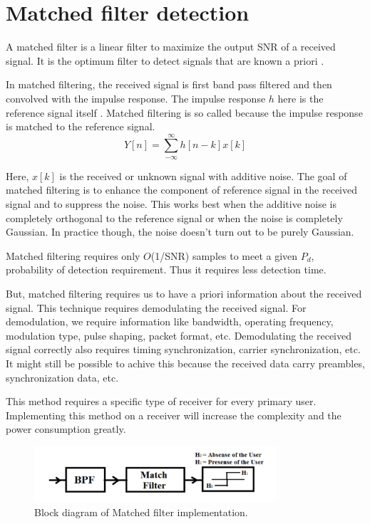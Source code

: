 \section{Matched filter detection}
A matched filter is a linear filter to maximize the output SNR of a received 
signal. It is the optimum filter to detect signals that are known a priori 
\cite{wikiMF}.


In matched filtering, the received signal is first band pass filtered and then
convolved with the impulse response. The impulse response $h$ here is the 
reference signal itself \cite{bhatta11}. Matched filtering is so called 
because the impulse response is matched to the reference signal.
\begin{equation*}
    Y[n] = \sum_{-\infty}^{\infty} h[n-k]x[k]
\end{equation*}

Here, $x[k]$ is the received or unknown signal with additive noise.
The goal of matched filtering is to enhance the component of reference signal
in the received signal and to suppress the noise. This works best when the 
additive noise is completely orthogonal to the reference signal or when the
noise is completely Gaussian. In practice though, the noise doesn't turn out 
to be purely Gaussian.
 
Matched filtering requires only $O$(1/SNR) samples to meet a given $P_d$, 
probability of detection requirement. Thus it requires less detection time.

But, matched filtering requires us to have a priori information about the 
received signal. This technique requires demodulating the received signal. For
demodulation, we require information like bandwidth, operating frequency, 
modulation type, pulse shaping, packet format, etc. Demodulating the received
signal correctly also requires timing synchronization, carrier 
synchronization, etc. It might still be possible to achive this because the
received data carry preambles, synchronization data, etc.

This method requires a specific type of receiver for every primary user.
Implementing this method on a receiver will increase the complexity and the 
power consumption greatly.

\begin{figure}
\centering
\includegraphics[width=0.8\textwidth]{matchedFilter}
\caption[Matched filter]{Block diagram of Matched filter implementation.}
\label{matchedFilter}
\end{figure}

